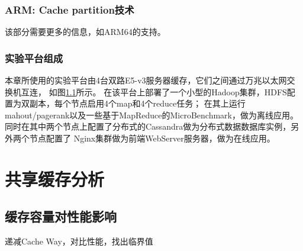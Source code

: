 

%

\subsubsection*{ARM: Cache partition技术}

该部分需要更多的信息，如ARM64的支持。


\subsubsection*{实验平台组成}

本章所使用的实验平台由4台双路E5-v3服务器缓存，它们之间通过万兆以太网交换机互连，
如图\ref{}所示。
在该平台上部署了一个小型的Hadoop集群，HDFS配置为双副本，每个节点启用4个map和4个reduce任务；
在其上运行mahout/pagerank以及一些基于MapReduce的MicroBenchmark，做为离线应用。
同时在其中两个节点上配置了分布式的Cassandra做为分布式数据数据库实例，另外两个节点配置了
Nginx集群做为前端WebServer服务器，做为在线应用。


\section{共享缓存分析}

\subsection{缓存容量对性能影响}

递减Cache Way，对比性能，找出临界值


